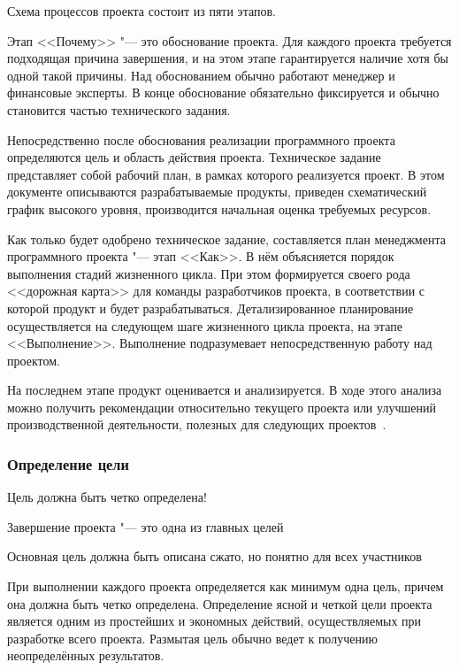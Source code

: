 \documentclass{../industrial-development}
\begin{document}
\lecturenotes
Схема процессов проекта состоит из пяти этапов.

Этап <<Почему>> "--- это обоснование проекта. Для каждого проекта требуется подходящая причина завершения, и на этом этапе гарантируется наличие хотя бы одной такой причины. Над обоснованием обычно работают менеджер и финансовые эксперты. В конце обоснование обязательно фиксируется и обычно становится частью технического задания.

Непосредственно после обоснования реализации программного проекта определяются цель и область действия проекта. Техническое задание представляет собой рабочий план, в рамках которого реализуется проект. В этом документе описываются разрабатываемые продукты, приведен схематический график высокого уровня, производится начальная оценка требуемых ресурсов.

Как только будет одобрено техническое задание, составляется план менеджмента программного проекта "--- этап <<Как>>. В нём объясняется порядок выполнения стадий жизненного цикла. При этом формируется своего рода <<дорожная карта>> для команды разработчиков проекта, в соответствии с которой продукт и будет разрабатываться. Детализированное планирование осуществляется на следующем шаге жизненного цикла проекта, на этапе <<Выполнение>>. Выполнение подразумевает непосредственную работу над проектом.

На последнем этапе продукт оценивается и анализируется. В ходе этого анализа можно получить рекомендации относительно текущего проекта или улучшений производственной деятельности, полезных для следующих проектов~\cite[с.~242--244]{Fatrell}.

\begin{frame} \frametitle{Определение цели}
  \begin{block}{}
    Цель должна быть четко определена!
  \end{block}
  \begin{block}{}
    Завершение проекта "--- это одна из главных целей
  \end{block}
  \begin{block}{}
    Основная цель должна быть описана сжато, но понятно для всех участников
  \end{block}
\end{frame}

\lecturenotes

При выполнении каждого проекта определяется как минимум одна цель, причем она должна быть четко определена. Определение ясной и четкой цели проекта является одним из простейших и экономных действий, осуществляемых при разработке всего проекта. Размытая цель обычно ведет к получению неопределённых результатов.
\end{document}

